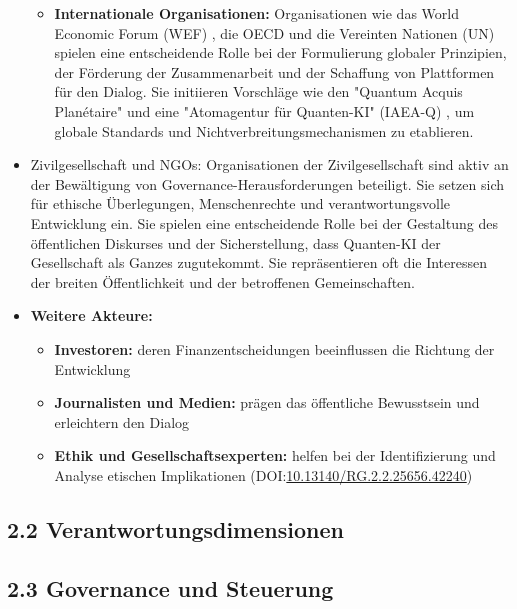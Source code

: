 \begin{itemize}
\begin{itemize}
    \item \textbf{Internationale Organisationen:} Organisationen wie das World Economic Forum (WEF) , die OECD  und die Vereinten Nationen (UN)  spielen eine entscheidende Rolle bei der Formulierung globaler Prinzipien, der Förderung der Zusammenarbeit und der Schaffung von Plattformen für den Dialog. Sie initiieren Vorschläge wie den "Quantum Acquis Planétaire"  und eine "Atomagentur für Quanten-KI" (IAEA-Q) , um globale Standards und Nichtverbreitungsmechanismen zu etablieren.
    \end{itemize}
    \item Zivilgesellschaft und NGOs: Organisationen der Zivilgesellschaft sind aktiv an der Bewältigung von Governance-Herausforderungen beteiligt. Sie setzen sich für ethische Überlegungen, Menschenrechte und verantwortungsvolle Entwicklung ein. Sie spielen eine entscheidende Rolle bei der Gestaltung des öffentlichen Diskurses und der Sicherstellung, dass Quanten-KI der Gesellschaft als Ganzes zugutekommt. Sie repräsentieren oft die Interessen der breiten Öffentlichkeit und der betroffenen Gemeinschaften.
    \item \textbf{Weitere Akteure: }
    \begin{itemize}
        \item \textbf{Investoren:} deren Finanzentscheidungen beeinflussen die Richtung der Entwicklung
        \item \textbf{Journalisten und Medien:} prägen das öffentliche Bewusstsein und erleichtern den Dialog
        \item \textbf{Ethik und Gesellschaftsexperten: }helfen bei der Identifizierung und Analyse etischen Implikationen
\cite{Communities of Quantum Technologies: Stakeholder Identification, Legitimation, and Interaction}
(DOI:\href{http://dx.doi.org/10.13140/RG.2.2.25656.42240}{10.13140/RG.2.2.25656.42240})    \end{itemize}
\end{itemize}


\subsection{2.2 Verantwortungsdimensionen}


\subsection{2.3 Governance und Steuerung}



